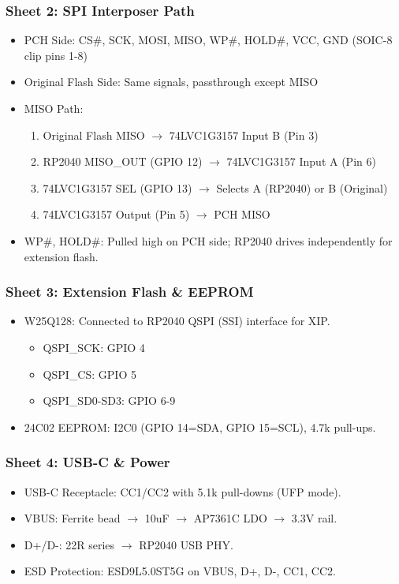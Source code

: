 \subsubsection{Sheet 2: SPI Interposer Path}
\begin{itemize}
    \item PCH Side: CS\#, SCK, MOSI, MISO, WP\#, HOLD\#, VCC, GND (SOIC-8 clip pins 1-8)
    \item Original Flash Side: Same signals, passthrough except MISO
    \item MISO Path: 
    \begin{enumerate}
        \item Original Flash MISO $\to$ 74LVC1G3157 Input B (Pin 3)
        \item RP2040 MISO\_OUT (GPIO 12) $\to$ 74LVC1G3157 Input A (Pin 6)
        \item 74LVC1G3157 SEL (GPIO 13) $\to$ Selects A (RP2040) or B (Original)
        \item 74LVC1G3157 Output (Pin 5) $\to$ PCH MISO
    \end{enumerate}
    \item WP\#, HOLD\#: Pulled high on PCH side; RP2040 drives independently for extension flash.
\end{itemize}

\subsubsection{Sheet 3: Extension Flash \& EEPROM}
\begin{itemize}
    \item W25Q128: Connected to RP2040 QSPI (SSI) interface for XIP.
    \begin{itemize}
        \item QSPI\_SCK: GPIO 4
        \item QSPI\_CS: GPIO 5
        \item QSPI\_SD0-SD3: GPIO 6-9
    \end{itemize}
    \item 24C02 EEPROM: I2C0 (GPIO 14=SDA, GPIO 15=SCL), 4.7k pull-ups.
\end{itemize}

\subsubsection{Sheet 4: USB-C \& Power}
\begin{itemize}
    \item USB-C Receptacle: CC1/CC2 with 5.1k pull-downs (UFP mode).
    \item VBUS: Ferrite bead $\to$ 10uF $\to$ AP7361C LDO $\to$ 3.3V rail.
    \item D+/D-: 22R series $\to$ RP2040 USB PHY.
    \item ESD Protection: ESD9L5.0ST5G on VBUS, D+, D-, CC1, CC2.
\end{itemize}

